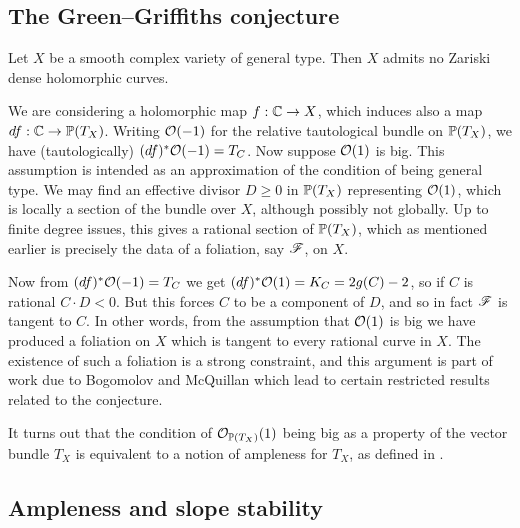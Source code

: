 

\subsection{The Green--Griffiths conjecture}


\begin{conjecture}
    Let $X$ be a smooth complex variety of general type. Then $X$ admits no
    Zariski dense holomorphic curves.
\end{conjecture}

We are considering a holomorphic map $f:\C\to X$, which induces also a map
$df:\C\to\P(T_X)$. Writing $\O(-1)$ for the relative tautological bundle on
$\P(T_X)$, we have (tautologically) $(df)^*\O(-1)=T_C$. Now suppose $\O(1)$ is
big. This assumption is intended as an approximation of the condition of being
general type. We may find an effective divisor $D\ge0$ in $\P(T_X)$ representing
$\O(1)$, which is locally a section of the bundle over $X$, although possibly
not globally. Up to finite degree issues, this gives a rational section of
$\P(T_X)$, which as mentioned earlier is precisely the data of a foliation, say
$\scrF$, on $X$.

Now from $(df)^*\O(-1)=T_C$ we get $(df)^*\O(1)=K_C=2g(C)-2$, so if $C$ is
rational $C\cdot D<0$. But this forces $C$ to be a component of $D$, and so in
fact $\scrF$ is tangent to $C$. %
In other words, from the assumption that $\O(1)$ is big we have produced a
foliation on $X$ which is tangent to every rational curve in $X$. The existence
of such a foliation is a strong constraint, and this argument is part of work
due to Bogomolov and McQuillan \cite{mcquillan_98} which lead to certain
restricted results related to the conjecture.

It turns out that the condition of $\O_{\P(T_X)}(1)$ being big as a property of
the vector bundle $T_X$ is equivalent to a notion of ampleness for $T_X$, as
defined in \cite{hartshorne_66}. %

\subsection{Ampleness and slope stability}

